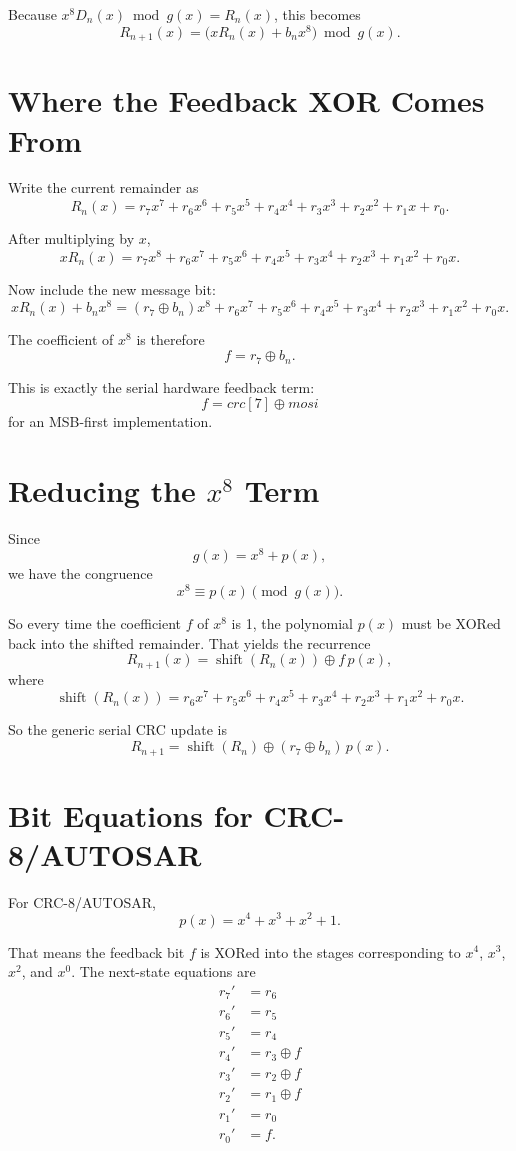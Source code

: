 \documentclass[11pt]{article}
\begin{document}
Because $x^8 D_n(x) \bmod g(x) = R_n(x)$, this becomes
\[
R_{n+1}(x) = \bigl(xR_n(x) + b_n x^8\bigr) \bmod g(x).
\]

\section{Where the Feedback XOR Comes From}

Write the current remainder as
\[
R_n(x) = r_7 x^7 + r_6 x^6 + r_5 x^5 + r_4 x^4 + r_3 x^3 + r_2 x^2 + r_1 x + r_0.
\]

After multiplying by $x$,
\[
xR_n(x) = r_7 x^8 + r_6 x^7 + r_5 x^6 + r_4 x^5 + r_3 x^4 + r_2 x^3 + r_1 x^2 + r_0 x.
\]

Now include the new message bit:
\[
xR_n(x) + b_n x^8 =
(r_7 \oplus b_n)x^8 + r_6 x^7 + r_5 x^6 + r_4 x^5 + r_3 x^4 + r_2 x^3 + r_1 x^2 + r_0 x.
\]

The coefficient of $x^8$ is therefore
\[
f = r_7 \oplus b_n.
\]

This is exactly the serial hardware feedback term:
\[
\boxed{f = \mathit{crc}[7] \oplus \mathit{mosi}}
\]
for an MSB-first implementation.

\section{Reducing the $x^8$ Term}

Since
\[
g(x) = x^8 + p(x),
\]
we have the congruence
\[
x^8 \equiv p(x) \pmod{g(x)}.
\]

So every time the coefficient $f$ of $x^8$ is 1, the polynomial $p(x)$ must be XORed
back into the shifted remainder. That yields the recurrence
\[
R_{n+1}(x) = \operatorname{shift}(R_n(x)) \oplus f\,p(x),
\]
where
\[
\operatorname{shift}(R_n(x)) = r_6 x^7 + r_5 x^6 + r_4 x^5 + r_3 x^4 + r_2 x^3 + r_1 x^2 + r_0 x.
\]

So the generic serial CRC update is
\[
\boxed{R_{n+1} = \operatorname{shift}(R_n) \oplus (r_7 \oplus b_n)\,p(x)}.
\]

\section{Bit Equations for CRC-8/AUTOSAR}

For CRC-8/AUTOSAR,
\[
p(x) = x^4 + x^3 + x^2 + 1.
\]

That means the feedback bit $f$ is XORed into the stages corresponding to
$x^4$, $x^3$, $x^2$, and $x^0$. The next-state equations are
\begin{align*}
r_7' &= r_6 \\
r_6' &= r_5 \\
r_5' &= r_4 \\
r_4' &= r_3 \oplus f \\
r_3' &= r_2 \oplus f \\
r_2' &= r_1 \oplus f \\
r_1' &= r_0 \\
r_0' &= f.
\end{align*}
\end{document}
